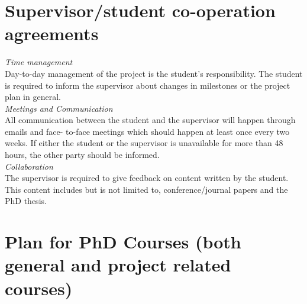 \section{Supervisor/student co-operation agreements}
\textit{Time management}
\vspace{0.15cm}
\\
\noindent Day-to-day management of the project is the student’s responsibility. The student is required to inform the supervisor about changes in milestones or the project plan in general.
\\

\noindent\textit{Meetings and Communication}
\vspace{0.15cm}
\\
\noindent All communication between the student and the supervisor will happen through emails and face- to-face meetings which should happen at least once every two weeks. If either the student or the supervisor is unavailable for more than 48 hours, the other party should be informed.
\\

\noindent\textit{Collaboration}
\vspace{0.15cm}
\\
\noindent The supervisor is required to give feedback on content written by the student. This content includes but is not limited to, conference/journal papers and the PhD thesis.

\section{Plan for PhD Courses (both general and project related courses)}

